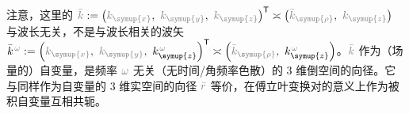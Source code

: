 注意，这里的 $\mathcolor{gray}{\bar{k}} := \left( \mathcolor{gray}{k_{\symup{x}}},~ \mathcolor{gray}{k_{\symup{y}}},~ \mathcolor{gray}{k_{\symup{z}}} \right)^\mathsf{T} \asymp \left( \mathcolor{gray}{\bar{k}_{\symup{\rho}}},~ \mathcolor{gray}{k_{\symup{z}}} \right)$ 与波长无关，不是与波长相关的波矢 $\bar{k}^{\;\! \mathcolor{gray}{\omega}} := \left( \mathcolor{gray}{k_{\symup{x}}},~ \mathcolor{gray}{k_{\symup{y}}},~ k_{\symup{z}}^{\;\! \mathcolor{gray}{\omega}} \right)^\mathsf{T} \asymp \left( \mathcolor{gray}{\bar{k}_{\symup{\rho}}},~ k_{\symup{z}}^{\;\! \mathcolor{gray}{\omega}} \right)$。$\mathcolor{gray}{\bar{k}}$ 作为（场量的）自变量，是频率 $\mathcolor{gray}{\omega}$ 无关（无时间/角频率色散）的 3 维倒空间的向径。它与同样作为自变量的 3 维实空间的向径 $\mathcolor{gray}{\bar{r}}$ 等价，在傅立叶变换对的意义上作为被积自变量互相共轭。

